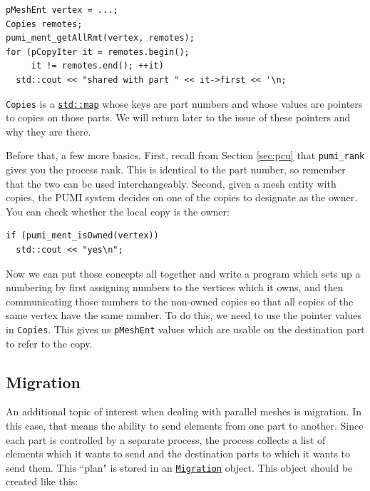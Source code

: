 \documentclass{article}
\begin{document}
{\begin{lstlisting}
pMeshEnt vertex = ...;
Copies remotes;
pumi_ment_getAllRmt(vertex, remotes);
for (pCopyIter it = remotes.begin();
     it != remotes.end(); ++it)
  std::cout << "shared with part " << it->first << '\n;
\end{lstlisting}

\texttt{Copies} is a
\href{http://www.cplusplus.com/reference/map/map/}{\texttt{std::map}}
whose keys are part numbers and whose
values are pointers to copies on those parts.
We will return later to the issue of these pointers and
why they are there.

Before that, a few more basics.
First, recall from Section \ref{sec:pcu} that \texttt{pumi\_rank}
gives you the process rank.
This is identical to the part number, so remember that the two
can be used interchangeably.
Second, given a mesh entity with copies, the PUMI system decides
on one of the copies to designate as the owner.
You can check whether the local copy is the owner:

\begin{lstlisting}
if (pumi_ment_isOwned(vertex))
  std::cout << "yes\n";
\end{lstlisting}

Now we can put those concepts all together and write a program
which sets up a numbering by first assigning numbers to
the vertices which it owns, and then communicating those
numbers to the non-owned copies so that all copies
of the same vertex have the same number.
To do this, we need to use the pointer values in \texttt{Copies}.
This gives us \texttt{pMeshEnt} values which are usable
on the destination part to refer to the copy.



\subsection{Migration}

An additional topic of interest when dealing with parallel
meshes is migration.
In this case, that means the ability to send elements
from one part to another.
Since each part is controlled by a separate process,
the process collects a list of elements which it
wants to send and the destination parts to which
it wants to send them.
This ``plan" is stored in an
\href{http://scorec.rpi.edu/~dibanez/core/classapf_1_1Migration.html}{\texttt{Migration}}
object.
This object should be created like this:

}
\end{document}

